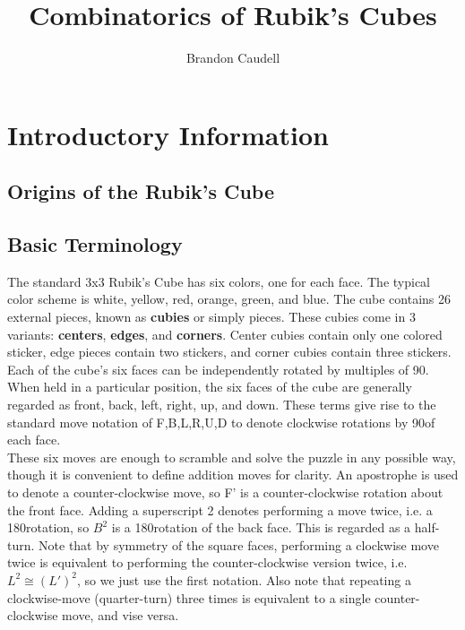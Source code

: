 \documentclass[10pt,letterpaper]{report}
\author{Brandon Caudell}
\title{Combinatorics of Rubik's Cubes}
\begin{document}
\maketitle
\newpage 
\tableofcontents
\newpage 
\chapter{Introductory Information}
\section{Origins of the Rubik's Cube}
\section{Basic Terminology}
The standard 3x3 Rubik's Cube has six colors, one for each face.  The typical color scheme is white, yellow, red, orange, green, and blue.  The cube contains 26 external pieces, known as \textbf{cubies} or simply pieces.  These cubies come in 3 variants: \textbf{centers}, \textbf{edges}, and \textbf{corners}.  Center cubies contain only one colored sticker, edge pieces contain two stickers, and corner cubies contain three stickers.\\

Each of the cube's six faces can be independently rotated by multiples of 90\textdegree.  When held in a particular position, the six faces of the cube are generally regarded as front, back, left, right, up, and down.  These terms give rise to the standard move notation of F,B,L,R,U,D to denote clockwise rotations by 90\textdegree of each face.\\

These six moves are enough to scramble and solve the puzzle in any possible way, though it is convenient to define addition moves for clarity.  An apostrophe is used to denote a counter-clockwise move, so F' is a counter-clockwise rotation about the front face.  Adding a superscript 2 denotes performing a move twice, i.e. a 180\textdegree rotation, so $B^2$ is a 180\textdegree rotation of the back face.  This is regarded as a half-turn.  Note that by symmetry of the square faces, performing a clockwise move twice is equivalent to performing the counter-clockwise version twice, i.e. $L^2 \cong (L')^2$, so we just use the first notation.  Also note that repeating a clockwise-move (quarter-turn) three times is equivalent to a single counter-clockwise move, and vise versa.\\
\end{document}
